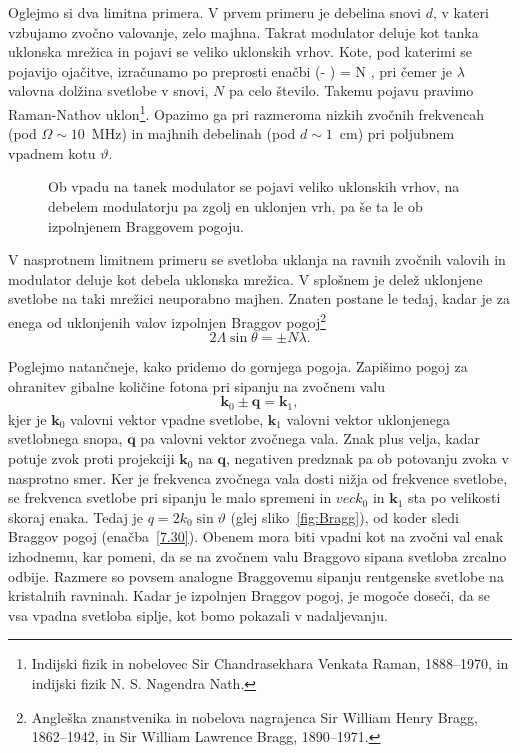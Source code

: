 Oglejmo si dva limitna primera. V prvem primeru je debelina snovi $d$, v kateri vzbujamo
zvočno valovanje, zelo majhna. Takrat modulator deluje 
kot tanka uklonska mrežica in pojavi se veliko 
uklonskih vrhov. Kote, pod katerimi se pojavijo ojačitve, izračunamo po preprosti enačbi
\beq
\Lambda (\sin \vartheta - \sin \beta ) = N \lambda,
\eeq
pri čemer je $\lambda$ valovna dolžina svetlobe v snovi, $N$ pa celo število. Takemu pojavu 
pravimo Raman-Nathov uklon\footnote{Indijski fizik in nobelovec Sir Chandrasekhara 
Venkata Raman, 1888--1970, 
in indijski fizik N. S. Nagendra Nath.}. Opazimo ga pri razmeroma nizkih zvočnih frekvencah 
(pod $\Omega\sim10$~MHz) in majhnih debelinah (pod $d\sim 1$~cm) pri poljubnem vpadnem 
kotu $\vartheta$.
\begin{figure}[h]
\centering
\def\svgwidth{50truemm} 
\qquad
\def\svgwidth{65truemm} 

\caption{Ob vpadu na tanek modulator se pojavi veliko uklonskih vrhov, na debelem modulatorju
pa zgolj en uklonjen vrh, pa še ta le ob izpolnjenem Braggovem pogoju. }
\label{fig:ao}
\end{figure}

V nasprotnem limitnem primeru se svetloba uklanja na ravnih zvočnih valovih in modulator deluje 
kot debela uklonska mrežica. V splošnem je delež uklonjene svetlobe na taki mrežici neuporabno majhen. 
Znaten postane le tedaj, kadar je za enega od uklonjenih valov izpolnjen Braggov
pogoj\footnote{Angleška znanstvenika in nobelova nagrajenca Sir William Henry Bragg, 1862--1942,
in Sir William Lawrence Bragg, 1890--1971.}
\begin{equation}
2 \Lambda\sin\theta=\pm N\lambda.
\label{7.29a}
\end{equation}

Poglejmo natančneje, kako pridemo do gornjega pogoja. Zapišimo pogoj
za ohranitev gibalne količine fotona pri sipanju na zvočnem valu
\begin{equation}
\mathbf{k}_{0}\pm\mathbf{q}=\mathbf{k}_{1},
\label{7.30}
\end{equation}
kjer je $\mathbf{k}_{0}$ valovni vektor vpadne svetlobe, $\mathbf{k}_{1}$
valovni vektor uklonjenega svetlobnega snopa, $\mathbf{q}$ pa valovni
vektor zvočnega vala. Znak plus velja, kadar potuje zvok proti projekciji
$\mathbf{k}_{0}$ na $\mathbf{q}$, negativen predznak pa ob potovanju zvoka v nasprotno smer. 
Ker je frekvenca zvočnega vala dosti nižja od frekvence svetlobe, se frekvenca svetlobe 
pri sipanju le malo spremeni in $vec{k}_{0}$ in $\mathbf{k}_{1}$ sta po velikosti skoraj enaka.
Tedaj je $q=2k_{0}\sin\vartheta$ (glej sliko~\ref{fig:Bragg}), od koder sledi Braggov pogoj 
(enačba~\ref{7.30}). Obenem mora biti vpadni kot na zvočni val enak izhodnemu, kar pomeni, da se na
zvočnem valu Braggovo sipana svetloba zrcalno odbije. Razmere so 
povsem analogne Braggovemu sipanju rentgenske svetlobe na kristalnih
ravninah. Kadar je izpolnjen Braggov pogoj, je mogoče doseči, da se
vsa vpadna svetloba siplje, kot bomo pokazali v nadaljevanju.

